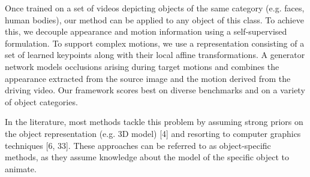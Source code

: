 \documentclass[english,12pt]{article}
\begin{document}
Once trained on a set of videos
depicting objects of the same category (e.g. faces, human bodies), our method can be applied to any
object of this class. To achieve this, we decouple appearance and motion information using a self-supervised
formulation. To support complex motions, we use a representation consisting of a set of learned keypoints
along with their local affine transformations. A generator network models occlusions arising during target
motions and combines the appearance extracted from the source image and the motion derived from the driving
video. Our framework scores best on diverse benchmarks and on a variety of object categories.

In the literature, most methods tackle this problem by assuming strong priors on the object representation
(e.g. 3D model) [4] and resorting to computer graphics techniques [6, 33]. These approaches can be referred
to as object-specific methods, as they assume knowledge about the model of the specific object to animate.
\end{document}
